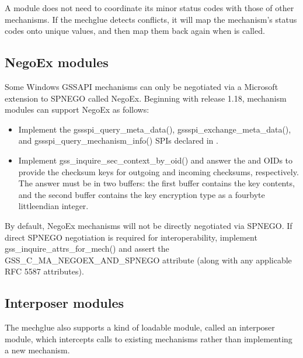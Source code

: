 \documentclass[letterpaper,10pt,english]{sphinxmanual}
\begin{document}
\sphinxAtStartPar
A module does not need to coordinate its minor status codes with those
of other mechanisms.  If the mechglue detects conflicts, it will map
the mechanism’s status codes onto unique values, and then map them
back again when  is called.


\subsection{NegoEx modules}
\label{\detokenize{plugindev/gssapi:negoex-modules}}
\sphinxAtStartPar
Some Windows GSSAPI mechanisms can only be negotiated via a Microsoft
extension to SPNEGO called NegoEx.  Beginning with release 1.18,
mechanism modules can support NegoEx as follows:
\begin{itemize}
\item {} 
\sphinxAtStartPar
Implement the gssspi\_query\_meta\_data(), gssspi\_exchange\_meta\_data(),
and gssspi\_query\_mechanism\_info() SPIs declared in
.

\item {} 
\sphinxAtStartPar
Implement gss\_inquire\_sec\_context\_by\_oid() and answer the
 and  OIDs
to provide the checksum keys for outgoing and incoming checksums,
respectively.  The answer must be in two buffers: the first buffer
contains the key contents, and the second buffer contains the key
encryption type as a four\sphinxhyphen{}byte little\sphinxhyphen{}endian integer.

\end{itemize}

\sphinxAtStartPar
By default, NegoEx mechanisms will not be directly negotiated via
SPNEGO.  If direct SPNEGO negotiation is required for
interoperability, implement gss\_inquire\_attrs\_for\_mech() and assert
the GSS\_C\_MA\_NEGOEX\_AND\_SPNEGO attribute (along with any applicable
RFC 5587 attributes).


\subsection{Interposer modules}
\label{\detokenize{plugindev/gssapi:interposer-modules}}
\sphinxAtStartPar
The mechglue also supports a kind of loadable module, called an
interposer module, which intercepts calls to existing mechanisms
rather than implementing a new mechanism.
\end{document}

